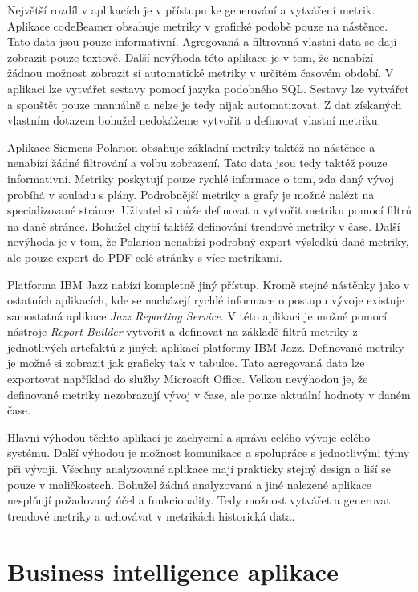 \documentclass[czech,master,public,dept460,male,cpdeclaration,oneside]{diploma}
\begin{document}
Největší rozdíl v aplikacích je v přístupu ke generování a vytváření metrik. Aplikace codeBeamer obsahuje metriky v grafické podobě pouze na nástěnce. Tato data jsou pouze informativní. Agregovaná a filtrovaná vlastní data se dají zobrazit pouze textově. Další nevýhoda této aplikace je v tom, že nenabízí žádnou možnost zobrazit si automatické metriky v určitém časovém období. V aplikaci lze vytvářet sestavy pomocí jazyka podobného SQL. Sestavy lze vytvářet a spouštět pouze manuálně a nelze je tedy nijak automatizovat. Z dat získaných vlastním dotazem bohužel nedokážeme vytvořit a definovat vlastní metriku. 

Aplikace Siemens Polarion obsahuje základní metriky taktéž na nástěnce a nenabízí žádné filtrování a volbu zobrazení. Tato data jsou tedy taktéž pouze informativní. Metriky poskytují pouze rychlé informace o tom, zda daný vývoj probíhá v souladu s plány. Podrobnější metriky a grafy je možné nalézt na specializované stránce. Uživatel si může definovat a vytvořit metriku pomocí filtrů na dané stránce. Bohužel chybí taktéž definování trendové metriky v čase. Další nevýhoda je v tom, že Polarion nenabízí podrobný export výsledků dané metriky, ale pouze export do PDF celé stránky s více metrikami.

Platforma IBM Jazz nabízí kompletně jiný přístup. Kromě stejné nástěnky jako v ostatních aplikacích, kde se nacházejí rychlé informace o postupu vývoje existuje samostatná aplikace \textit{Jazz Reporting Service}. V této aplikaci je možné pomocí nástroje \textit{Report Builder} vytvořit a definovat na základě filtrů metriky z jednotlivých artefaktů z jiných aplikací platformy IBM Jazz. Definované metriky je možné si zobrazit jak graficky tak v tabulce. Tato agregovaná data lze exportovat například do služby Microsoft Office. Velkou nevýhodou je, že definované metriky nezobrazují vývoj v čase, ale pouze aktuální hodnoty v daném čase. 

Hlavní výhodou těchto aplikací je zachycení a správa celého vývoje celého systému. Další výhodou je možnost komunikace a spolupráce s jednotlivými týmy při vývoji. Všechny analyzované aplikace mají prakticky stejný design a liší se pouze v maličkostech. Bohužel žádná analyzovaná a jiné nalezené aplikace nesplňují požadovaný účel a funkcionality. Tedy možnost vytvářet a generovat trendové metriky a uchovávat v metrikách historická data.

\newpage %
\section{Business intelligence aplikace}
\end{document}
